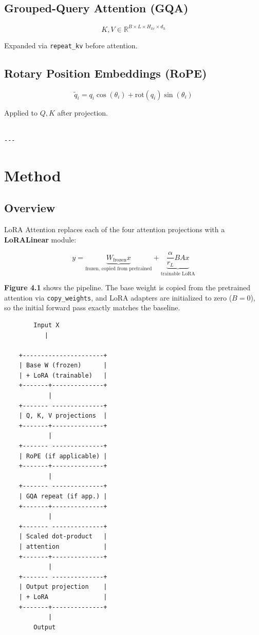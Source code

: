 \subsection{Grouped-Query Attention (GQA)}

\[
K, V \in \mathbb{R}^{B \times L \times H_{kv} \times d_h}
\tag{3.7}
\]

Expanded via \texttt{repeat\_kv} before attention.

\subsection{Rotary Position Embeddings (RoPE)}

\[
\tilde{q}_i = q_i \cos(\theta_i) + \text{rot}(q_i) \sin(\theta_i)
\tag{3.8}
\]

Applied to $Q, K$ after projection.
\begin{lstlisting}

---
\end{lstlisting}

\section{Method}

\subsection{Overview}

LoRA Attention replaces each of the four attention projections with a 
\textbf{LoRALinear} module:

\[
y = \underbrace{W_\text{frozen} x}_{\text{frozen, copied from pretrained}} + 
    \underbrace{\frac{\alpha}{r_L} B A x}_{\text{trainable LoRA}}
\tag{4.1}
\]

\textbf{Figure 4.1} shows the pipeline. The base weight is copied from the 
pretrained attention via \texttt{copy\_weights}, and LoRA adapters are initialized 
to zero ($B = 0$), so the initial forward pass exactly matches the baseline.

\begin{lstlisting}
        Input X
           |
            
    +----------------------+
    | Base W (frozen)      |
    | + LoRA (trainable)   |
    +-------+--------------+
            |
    +------- --------------+
    | Q, K, V projections  |
    +-------+--------------+
            |
    +------- --------------+
    | RoPE (if applicable) |
    +-------+--------------+
            |
    +------- --------------+
    | GQA repeat (if app.) |
    +-------+--------------+
            |
    +------- --------------+
    | Scaled dot-product   |
    | attention            |
    +-------+--------------+
            |
    +------- --------------+
    | Output projection    |
    | + LoRA               |
    +-------+--------------+
            |
        Output
\end{lstlisting}

